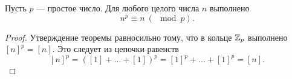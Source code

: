 \begin{theorem}
    Пусть $p$ --- простое число. Для любого целого числа $n$ выполнено
    $$
    n^p \equiv n\ (\mod p).
    $$
\end{theorem}

\begin{proof}
    Утверждение теоремы равносильно тому, что в кольце $\mathbb{Z}_p$ выполнено $[n]^p = [n]$. Это следует из цепочки равенств
    $$
    [n]^p = ([1] + \ldots + [1])^p = [1]^p + \ldots + [1]^p = [n].
    $$
\end{proof}


